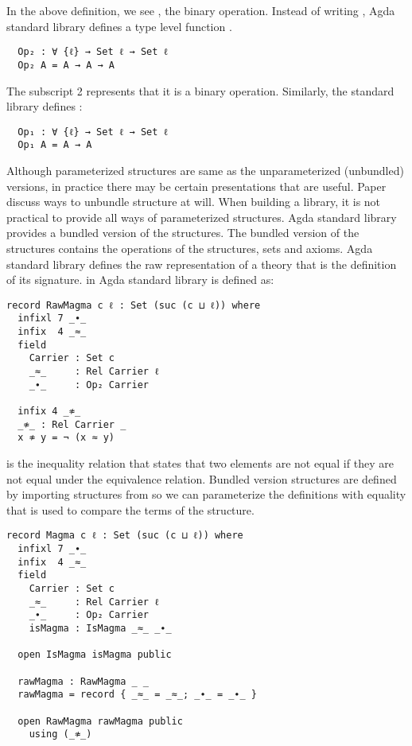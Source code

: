 In the above definition, we see , the binary operation.
Instead of writing , Agda standard library defines a type
level function .

\begin{verbatim}
  Op₂ : ∀ {ℓ} → Set ℓ → Set ℓ
  Op₂ A = A → A → A
\end{verbatim}

The subscript 2 represents that it is a binary operation. Similarly, the
standard library defines :

\begin{verbatim}
  Op₁ : ∀ {ℓ} → Set ℓ → Set ℓ
  Op₁ A = A → A
\end{verbatim}

Although parameterized structures are same as the unparameterized (unbundled)
versions, in practice there may be certain presentations that are useful. Paper
\cite{al2019language} discuss ways to unbundle structure at will. When building
a library, it is not practical to provide all ways of parameterized structures.
Agda standard library provides a bundled version of the structures. The bundled
version of the structures contains the operations of the structures, sets and
axioms. Agda standard library defines the raw representation of a theory that is
the definition of its signature.  in Agda standard library is defined as:

\begin{verbatim}
record RawMagma c ℓ : Set (suc (c ⊔ ℓ)) where
  infixl 7 _∙_
  infix  4 _≈_
  field
    Carrier : Set c
    _≈_     : Rel Carrier ℓ
    _∙_     : Op₂ Carrier

  infix 4 _≉_
  _≉_ : Rel Carrier _
  x ≉ y = ¬ (x ≈ y)
\end{verbatim}

 is the inequality relation that states that two elements are not
equal  if they are not equal under the equivalence relation.
Bundled version structures are defined by importing structures from
 so we can parameterize the definitions with equality that
is used to compare the terms of the structure.

\begin{verbatim}
record Magma c ℓ : Set (suc (c ⊔ ℓ)) where
  infixl 7 _∙_
  infix  4 _≈_
  field
    Carrier : Set c
    _≈_     : Rel Carrier ℓ
    _∙_     : Op₂ Carrier
    isMagma : IsMagma _≈_ _∙_

  open IsMagma isMagma public

  rawMagma : RawMagma _ _
  rawMagma = record { _≈_ = _≈_; _∙_ = _∙_ }

  open RawMagma rawMagma public
    using (_≉_)
\end{verbatim}

